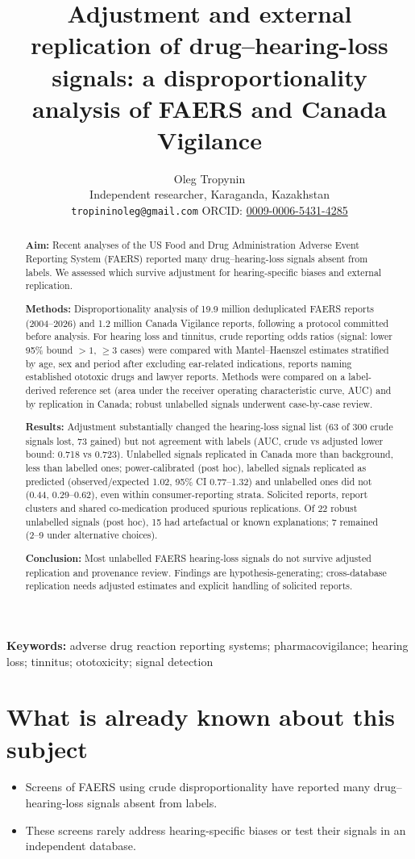 \documentclass[11pt]{article}
\title{Adjustment and external replication of drug--hearing-loss signals:
a disproportionality analysis of FAERS and Canada Vigilance}
\author{Oleg Tropynin\\ \small Independent researcher, Karaganda, Kazakhstan\\ \small \texttt{tropininoleg@gmail.com}
\quad ORCID: \href{https://orcid.org/0009-0006-5431-4285}{0009-0006-5431-4285}}
\date{}
\begin{document}
\maketitle

\begin{abstract}
\noindent\textbf{Aim:} Recent analyses of the US Food and Drug Administration Adverse Event
Reporting System (FAERS) reported many drug--hearing-loss signals absent from labels. We assessed which survive adjustment for
hearing-specific biases and external replication.

\noindent\textbf{Methods:} Disproportionality analysis of 19.9 million deduplicated FAERS reports
(2004--2026) and 1.2 million Canada Vigilance reports, following a protocol committed before
analysis. For hearing loss and tinnitus, crude reporting odds ratios (signal: lower 95\% bound $>1$, $\geq$3 cases) were
compared with Mantel--Haenszel estimates stratified by age, sex and period after excluding ear-related indications, reports
naming established ototoxic drugs and lawyer reports. Methods were compared on a label-derived reference set (area under the
receiver operating characteristic curve, AUC) and by replication in Canada; robust unlabelled signals underwent
case-by-case review.

\noindent\textbf{Results:} Adjustment substantially changed the hearing-loss signal list
(63 of 300 crude signals lost, 73 gained) but not agreement
with labels (AUC, crude vs adjusted lower bound: 0.718 vs
0.723). Unlabelled signals replicated in Canada more than background, less than labelled ones; power-calibrated (post hoc), labelled signals replicated as predicted (observed/expected
1.02, 95\% CI 0.77--1.32)
and unlabelled ones did not (0.44, 0.29--0.62),
even within consumer-reporting strata. Solicited reports, report clusters and shared
co-medication produced spurious replications. Of 22 robust unlabelled signals (post hoc), 15 had artefactual or known
explanations; 7 remained (2--9 under
alternative choices).

\noindent\textbf{Conclusion:} Most unlabelled FAERS hearing-loss signals do not survive adjusted replication and provenance
review. Findings are hypothesis-generating; cross-database replication needs adjusted estimates and explicit
handling of solicited reports.
\end{abstract}
\noindent\textbf{Keywords:} adverse drug reaction reporting systems; pharmacovigilance; hearing loss; tinnitus; ototoxicity; signal detection


\section*{What is already known about this subject}
\begin{itemize}
\item Screens of FAERS using crude disproportionality have reported many drug--hearing-loss signals absent from labels.
\item These screens rarely address hearing-specific biases or test their signals in an independent database.
\end{itemize}
\end{document}
